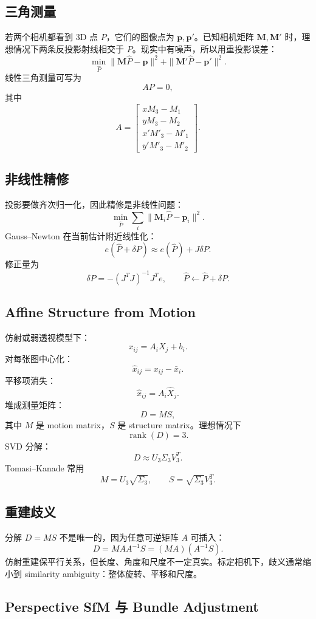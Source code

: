 \documentclass[11pt]{article}
\newcommand{\M}{\mathbf{M}}
\newcommand{\p}{\mathbf{p}}
\begin{document}
\subsection{三角测量}

若两个相机都看到 3D 点 $P$，它们的图像点为 $\p,\p'$。已知相机矩阵 $\M,\M'$ 时，理想情况下两条反投影射线相交于 $P$。现实中有噪声，所以用重投影误差：
\[
  \min_{\hat P}
  \|\M\hat P-\p\|^2+\|\M'\hat P-\p'\|^2.
\]
线性三角测量可写为
\[
  AP=0,
\]
其中
\[
  A=
  \begin{bmatrix}
    xM_3-M_1\\
    yM_3-M_2\\
    x'M'_3-M'_1\\
    y'M'_3-M'_2
  \end{bmatrix}.
\]

\subsection{非线性精修}

投影要做齐次归一化，因此精修是非线性问题：
\[
  \min_{\hat P}\sum_i\|\M_i\hat P-\p_i\|^2.
\]
Gauss--Newton 在当前估计附近线性化：
\[
  e(\hat P+\delta P)\approx e(\hat P)+J\delta P.
\]
修正量为
\[
  \delta P=-(J^TJ)^{-1}J^Te,
\qquad
  \hat P\leftarrow \hat P+\delta P.
\]

\subsection{Affine Structure from Motion}

仿射或弱透视模型下：
\[
  x_{ij}=A_iX_j+b_i.
\]
对每张图中心化：
\[
  \hat x_{ij}=x_{ij}-\bar x_i.
\]
平移项消失：
\[
  \hat x_{ij}=A_i\hat X_j.
\]
堆成测量矩阵：
\[
  D=MS,
\]
其中 $M$ 是 motion matrix，$S$ 是 structure matrix。理想情况下
\[
  \operatorname{rank}(D)=3.
\]
SVD 分解：
\[
  D\approx U_3\Sigma_3V_3^T.
\]
Tomasi--Kanade 常用
\[
  M=U_3\sqrt{\Sigma_3},\qquad S=\sqrt{\Sigma_3}V_3^T.
\]

\subsection{重建歧义}

分解 $D=MS$ 不是唯一的，因为任意可逆矩阵 $A$ 可插入：
\[
  D=MAA^{-1}S=(MA)(A^{-1}S).
\]
仿射重建保平行关系，但长度、角度和尺度不一定真实。标定相机下，歧义通常缩小到 similarity ambiguity：整体旋转、平移和尺度。

\subsection{Perspective SfM 与 Bundle Adjustment}
\end{document}
